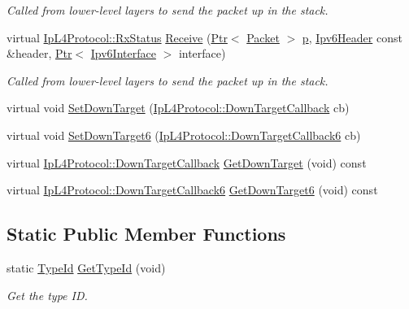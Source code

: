 \begin{DoxyCompactItemize}
\begin{DoxyCompactList}\small\item\em Called from lower-\/level layers to send the packet up in the stack. \end{DoxyCompactList}\item 
virtual \hyperlink{classns3_1_1IpL4Protocol_afd3744c89902fff232e2fd45f558c80e}{Ip\+L4\+Protocol\+::\+Rx\+Status} \hyperlink{classns3_1_1NscTcpL4Protocol_a60ebe021fc098f598eb7a0790c296ba7}{Receive} (\hyperlink{classns3_1_1Ptr}{Ptr}$<$ \hyperlink{classns3_1_1Packet}{Packet} $>$ \hyperlink{lte__link__budget__x2__handover__measures_8m_ac9de518908a968428863f829398a4e62}{p}, \hyperlink{classns3_1_1Ipv6Header}{Ipv6\+Header} const \&header, \hyperlink{classns3_1_1Ptr}{Ptr}$<$ \hyperlink{classns3_1_1Ipv6Interface}{Ipv6\+Interface} $>$ interface)
\begin{DoxyCompactList}\small\item\em Called from lower-\/level layers to send the packet up in the stack. \end{DoxyCompactList}\item 
virtual void \hyperlink{classns3_1_1NscTcpL4Protocol_afd0f881f664dde5aa7078186760eb010}{Set\+Down\+Target} (\hyperlink{classns3_1_1IpL4Protocol_ae3ba76c0a48fbaa90529c528a15f12b6}{Ip\+L4\+Protocol\+::\+Down\+Target\+Callback} cb)
\item 
virtual void \hyperlink{classns3_1_1NscTcpL4Protocol_a7bb5a07c6eb215f2b77d15516d8681cd}{Set\+Down\+Target6} (\hyperlink{classns3_1_1IpL4Protocol_a039f3d1883632ab922fa958fc9ecd97f}{Ip\+L4\+Protocol\+::\+Down\+Target\+Callback6} cb)
\item 
virtual \hyperlink{classns3_1_1IpL4Protocol_ae3ba76c0a48fbaa90529c528a15f12b6}{Ip\+L4\+Protocol\+::\+Down\+Target\+Callback} \hyperlink{classns3_1_1NscTcpL4Protocol_ad3210b62d5ab950b0fa9920eafb0060a}{Get\+Down\+Target} (void) const 
\item 
virtual \hyperlink{classns3_1_1IpL4Protocol_a039f3d1883632ab922fa958fc9ecd97f}{Ip\+L4\+Protocol\+::\+Down\+Target\+Callback6} \hyperlink{classns3_1_1NscTcpL4Protocol_a86cb36855c649416af6fd0aa3176c678}{Get\+Down\+Target6} (void) const 
\end{DoxyCompactItemize}
\subsection*{Static Public Member Functions}
\begin{DoxyCompactItemize}
\item 
static \hyperlink{classns3_1_1TypeId}{Type\+Id} \hyperlink{classns3_1_1NscTcpL4Protocol_a2a6f330ce93376d7e2b4a09741565a9c}{Get\+Type\+Id} (void)
\begin{DoxyCompactList}\small\item\em Get the type ID. \end{DoxyCompactList}\end{DoxyCompactItemize}
